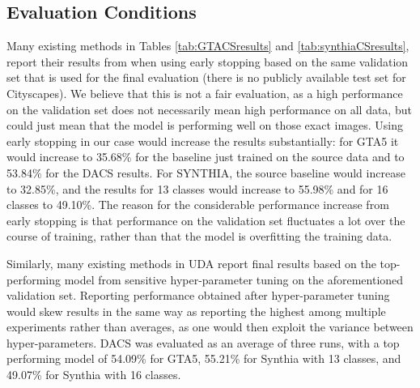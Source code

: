 \documentclass[10pt,twocolumn,letterpaper]{article}
\begin{document}
\subsection{Evaluation Conditions}


Many existing methods in Tables \ref{tab:GTACSresults} and \ref{tab:synthiaCSresults}, report their results from when using early stopping based on the same validation set that is used for the final evaluation (there is no publicly available test set for Cityscapes). We believe that this is not a fair evaluation, as a high performance on the validation set does not necessarily mean high performance on all data, but could just mean that the model is performing well on those exact images. Using early stopping in our case would increase the results substantially: for GTA5 it would increase to 35.68\% for the baseline just trained on the source data and to 53.84\% for the DACS results. For SYNTHIA, the source baseline would increase to 32.85\%, and the results for 13 classes would increase to 55.98\% and for 16 classes to 49.10\%. The reason for the considerable performance increase from early stopping is that performance on the validation set fluctuates a lot over the course of training, rather than that the model is overfitting the training data.


Similarly, many existing methods in UDA report final results based on the top-performing model from sensitive hyper-parameter tuning on the aforementioned validation set. Reporting performance obtained after hyper-parameter tuning would skew results in the same way as reporting the highest among multiple experiments rather than averages, as one would then exploit the variance between hyper-parameters. DACS was evaluated as an average of three runs, with a top performing model of 54.09\% for GTA5, 55.21\% for Synthia with 13 classes, and 49.07\% for Synthia with 16 classes. 
\end{document}
